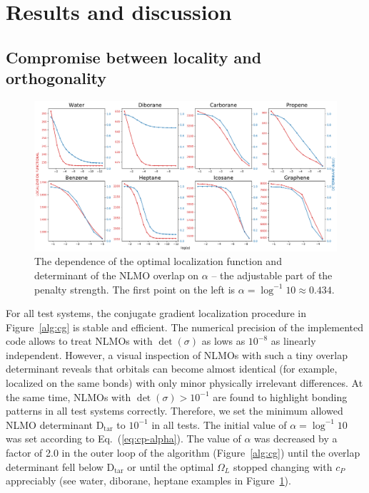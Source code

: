 \documentclass[aps,prl,reprint,amsmath,amssymb]{revtex4-1}
\begin{document}
\section{Results and discussion}

\subsection{Compromise between locality and orthogonality}

\begin{figure}[hbpt]
\centering
\includegraphics[width=\textwidth]{trend.pdf}
\caption{The dependence of the optimal localization function and determinant of the NLMO overlap on $\alpha$ -- the adjustable part of the penalty strength. The first point on the left is $\alpha = \log^{-1} 10 \approx 0.434$.}
\label{fig:alpha}
\end{figure}

For all test systems, the conjugate gradient localization procedure in Figure~\ref{alg:cg} is stable and efficient. The numerical precision of the implemented code allows to treat NLMOs with $\det(\sigma)$ as lows as $10^{-8}$ as linearly independent. However, a visual inspection of NLMOs with such a tiny overlap determinant reveals that orbitals can become almost identical (for example, localized on the same bonds) with only minor physically irrelevant differences. At the same time, NLMOs with $\det(\sigma) > 10^{-1}$ are found to highlight bonding patterns in all test systems correctly. Therefore, we set the minimum allowed NLMO determinant $\text{D}_{\text{tar}}$ to $10^{-1}$ in all tests. The initial value of $\alpha=\log^{-1} 10$ was set according to Eq.~(\ref{eq:cp-alpha}). The value of $\alpha$ was decreased by a factor of 2.0 in the outer loop of the algorithm (Figure~\ref{alg:cg}) until the overlap determinant fell below $\text{D}_{\text{tar}}$ or until the optimal $\Omega_{L}$ stopped changing with $c_P$ appreciably (see water, diborane, heptane examples in Figure~\ref{fig:alpha}).
\end{document}

